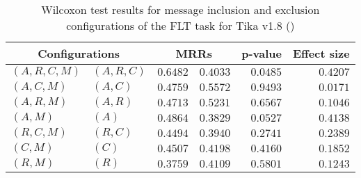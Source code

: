 
\begin{table}
\begin{spacing}{1.2}
\centering
\caption{Wilcoxon test results for message inclusion and exclusion configurations of the FLT task for Tika v1.8 (\ctwo)}
\label{table:versus-wilcox-tika-flt-message}
\begin{tabular}{ll|rr|rr}
\toprule
      \multicolumn{2}{c|}{Configurations} &                \multicolumn{2}{c|}{MRRs} &             p-value & Effect size \\
\midrule
 $(A,R,C,M)$ &  $(A,R,C)$ &  $\bm{0.6482}$ &       $0.4033$ & $0.0485$ &    $0.4207$ \\
   $(A,C,M)$ &    $(A,C)$ &       $0.4759$ &  $\bm{0.5572}$ & $0.9493$ &    $0.0171$ \\
   $(A,R,M)$ &    $(A,R)$ &       $0.4713$ &  $\bm{0.5231}$ & $0.6567$ &    $0.1046$ \\
     $(A,M)$ &      $(A)$ &  $\bm{0.4864}$ &       $0.3829$ & $0.0527$ &    $0.4138$ \\
   $(R,C,M)$ &    $(R,C)$ &  $\bm{0.4494}$ &       $0.3940$ & $0.2741$ &    $0.2389$ \\
     $(C,M)$ &      $(C)$ &  $\bm{0.4507}$ &       $0.4198$ & $0.4160$ &    $0.1852$ \\
     $(R,M)$ &      $(R)$ &       $0.3759$ &  $\bm{0.4109}$ & $0.5801$ &    $0.1243$ \\
\bottomrule
\end{tabular}

\end{spacing}
\end{table}

